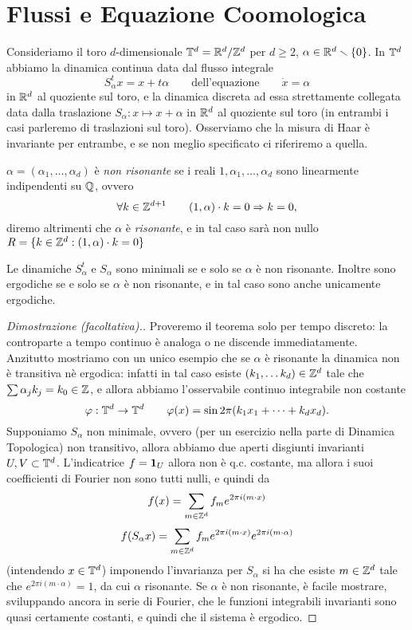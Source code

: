 \section{Flussi e Equazione Coomologica}

Consideriamo il toro $d$-dimensionale $\mathbb{T}^d=\mathbb{R}^d/\mathbb{Z}^d$ per $d\geq 2$, $\alpha\in\mathbb{R}^d\smallsetminus \{0\}$. In $\mathbb{T}^d$ abbiamo la dinamica continua data dal flusso integrale 
\[S^t_\alpha x=x+t\alpha \qquad \mbox{dell'equazione} \qquad \dot x=\alpha\]
in $\mathbb{R}^d$ al quoziente sul toro, e la dinamica discreta ad essa strettamente collegata data dalla traslazione 
$S_\alpha: x\mapsto x+\alpha$ in $\mathbb{R}^d$ al quoziente sul toro (in entrambi i casi parleremo di traslazioni sul toro). 
Osserviamo che la misura di Haar è invariante per entrambe, e se non meglio specificato ci riferiremo a quella.

\begin{defi} $\alpha=(\alpha_1,\dots,\alpha_d)$ è \emph{non risonante} se i reali $1,\alpha_1,\dots,\alpha_d$ sono linearmente indipendenti su $\mathbb{Q}$, ovvero
 \[\forall k\in \mathbb{Z}^{d+1} \qquad (1,\alpha)\cdot k=0 \Rightarrow k=0,\]
 diremo altrimenti che $\alpha$ è \emph{risonante}, e in tal caso sarà non nullo $R=\{k\in\mathbb{Z}^d:(1,\alpha)\cdot k=0\}$
\end{defi}

\begin{teo} Le dinamiche $S^t_\alpha$ e $S_\alpha$ sono minimali se e solo se $\alpha$ è non risonante. 
Inoltre sono ergodiche se e solo se $\alpha$ è non risonante, e in tal caso sono anche unicamente ergodiche.\end{teo}

\begin{proof}[Dimostrazione (facoltativa).]
 Proveremo il teorema solo per tempo discreto: la controparte a tempo continuo è analoga o ne discende immediatamente. 
 Anzitutto mostriamo con un unico esempio che se $\alpha$ è risonante la dinamica non è transitiva nè ergodica: 
 infatti in tal caso esiste $(k_1,\dots k_d)\in\mathbb{Z}^d$ tale che $\sum\alpha_j k_j=k_0\in\mathbb{Z}$, e allora abbiamo l'osservabile continuo integrabile non costante
 \[\varphi:\mathbb{T}^d\rightarrow \mathbb{T}^d \qquad \varphi(x)=\sin 2\pi(k_1x_1+\dots+k_dx_d).\]
 Supponiamo $S_\alpha$ non minimale, ovvero (per un esercizio nella parte di Dinamica Topologica) non transitivo, 
 allora abbiamo due aperti disgiunti invarianti $U,V\subset \mathbb{T}^d$. L'indicatrice $f=\bm{1}_U$ allora non è q.c. costante, ma allora i suoi coefficienti di Fourier
 non sono tutti nulli, e quindi da
 \[f(x)=\sum_{m\in \mathbb{Z}^d} f_m e^{2\pi i (m\cdot x)}\]
 \[f(S_\alpha x )=\sum_{m\in \mathbb{Z}^d} f_m e^{2\pi i (m\cdot x)} e^{2\pi i (m\cdot \alpha)}\]
 (intendendo $x\in \mathbb{T}^d$) imponendo l'invarianza per $S_\alpha$ si ha che esiste $m\in\mathbb{Z}^d$ tale che $e^{2\pi i (m\cdot \alpha)}=1$, da cui $\alpha$ risonante.
 Se $\alpha$ è non risonante, è facile mostrare, sviluppando ancora in serie di Fourier, che le funzioni integrabili invarianti sono quasi certamente costanti,
 e quindi che il sistema è ergodico.
\end{proof}

